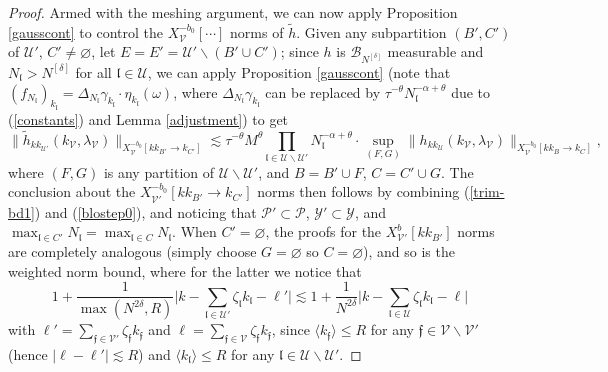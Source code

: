 \documentclass[11 pt,reqno]{amsart}
\theoremstyle{definition}
\theoremstyle{remark}
\numberwithin{equation}{section}
\newcommand{\Pc}{\mathcal{P}}
\newcommand{\Uc}{\mathcal{U}}
\newcommand{\Bc}{\mathcal{B}}
\newcommand{\Vc}{\mathcal{V}}
\newcommand{\Yc}{\mathcal{Y}}
\newcommand{\ff}{\mathfrak{f}}
\newcommand{\lf}{\mathfrak{l}}
\begin{document}
{\begin{proof}
Armed with the meshing argument, we can now apply Proposition \ref{gausscont} to control the $X_\Vc^{-b_0}[\cdots]$ norms of $\widetilde{h}$. Given any subpartition $(B',C')$ of $\Uc'$, $C'\neq\varnothing$, let $E=E'=\Uc'\backslash(B'\cup C')$; since $h$ is $\Bc_{N^{[\delta]}}$ measurable and $N_\lf>N^{[\delta]}$ for all $\lf\in\Uc$, we can apply Proposition \ref{gausscont} (note that $(f_{N_\lf})_{k_\lf}=\Delta_{N_\lf}\gamma_{k_\lf}\cdot\eta_{k_\lf}(\omega)$, where $\Delta_{N_\lf}\gamma_{k_\lf}$ can be replaced by $\tau^{-\theta}N_\lf^{-\alpha+\theta}$ due to (\ref{constants}) and Lemma \ref{adjustment}) to get
\[\|\widetilde{h}_{kk_{\Uc'}}(k_\Vc,\lambda_\Vc)\|_{X_\Vc^{-b_0}[kk_{B'}\to k_{C'}]}\lesssim\tau^{-\theta}M^\theta\prod_{\lf\in\Uc\backslash\Uc'}N_\lf^{-\alpha+\theta}\cdot\sup_{(F,G)}\|h_{kk_{\Uc}}(k_\Vc,\lambda_\Vc)\|_{X_\Vc^{-b_0}[kk_{B}\to k_{C}]},\] where $(F,G)$ is any partition of $\Uc\backslash\Uc'$, and $B=B'\cup F$, $C=C'\cup G$. The conclusion about the $X_{\Vc'}^{-b_0}[kk_{B'}\to k_{C'}]$ norms then follows by combining (\ref{trim-bd1}) and (\ref{blostep0}), and noticing that $\Pc'\subset\Pc$, $\Yc'\subset\Yc$, and $\max_{\lf\in C'}N_\lf=\max_{\lf\in C}N_\lf$. When $C'=\varnothing$, the proofs for the $X_{\Vc'}^b[kk_{B'}]$ norms are completely analogous (simply choose $G=\varnothing$ so $C=\varnothing$), and so is the weighted norm bound, where for the latter we notice that
\[1+\frac{1}{\max(N^{2\delta},R)}\bigg|k-\sum_{\lf\in\Uc'}\zeta_\lf k_\lf-\ell'\bigg|\lesssim 1+\frac{1}{N^{2\delta}}\bigg|k-\sum_{\lf\in\Uc}\zeta_\lf k_\lf-\ell\bigg|\] with $\ell'=\sum_{\ff\in\Vc'}\zeta_\ff k_\ff$ and $\ell=\sum_{\ff\in\Vc}\zeta_\ff k_\ff$, since $\langle k_\ff\rangle\leq R$ for any $\ff\in\Vc\backslash\Vc'$ (hence $|\ell-\ell'|\lesssim R$) and $\langle k_\lf\rangle\leq R$ for any $\lf\in\Uc\backslash\Uc'$.


\end{proof}}
\end{document}
